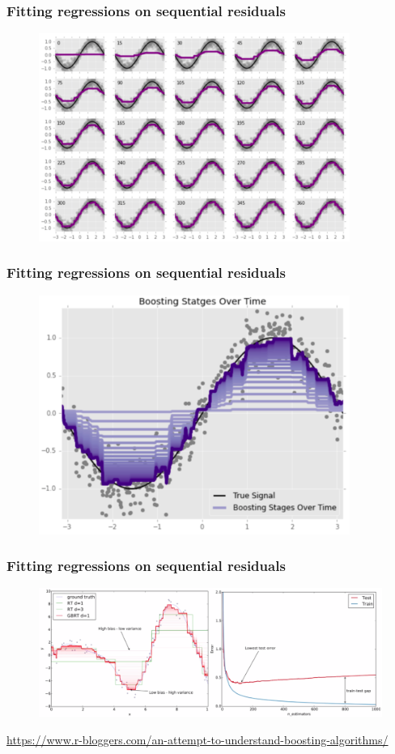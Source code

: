 \documentclass[xcolor={dvipsnames}]{beamer}
\begin{document}
\frame
{
 \frametitle{Fitting regressions on sequential residuals}

\begin{figure}
\centering
\includegraphics[width=4in]{stuff/boosting4.png}
\end{figure}
}


\frame
{
 \frametitle{Fitting regressions on sequential residuals}

\begin{figure}
\centering
\includegraphics[width=4in]{stuff/boosting5.png}
\end{figure}
}

\frame
{
 \frametitle{Fitting regressions on sequential residuals}

\begin{figure}
\centering
\hspace*{-.375in}\includegraphics[width=5in]{stuff/boosting3.png}
\end{figure}

\hspace{.45in}\tiny \url{https://www.r-bloggers.com/an-attempt-to-understand-boosting-algorithms/}

}
\end{document}
